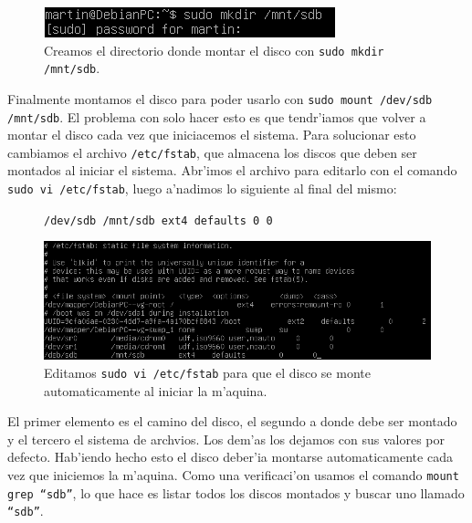 \documentclass[11pt]{article}
\newcommand{\codetext}[2]{\large\texttt{\textcolor{#1}{#2}}}
\begin{document}
		\begin{figure}[H]
    			\centering
    			\includegraphics[scale=0.75]{Images/rsync/rsync_disk_mount.PNG}
    			\caption{Creamos el directorio donde montar el disco con \texttt{sudo mkdir /mnt/sdb}.}
    			\label{fig:rsync_disk_mount}
		\end{figure}

		Finalmente montamos el disco para poder usarlo con \texttt{sudo mount /dev/sdb /mnt/sdb}. El problema con solo hacer esto es que tendr'iamos que volver a montar el disco cada vez que iniciacemos el sistema. Para solucionar esto cambiamos el archivo \texttt{/etc/fstab}, que almacena los discos que deben ser montados al iniciar el sistema. Abr'imos el archivo para editarlo con el comando \texttt{sudo vi /etc/fstab}, luego a'nadimos lo siguiente al final del mismo:

		\begin{figure}[H]
			\centering
			\begin{code-box}
				\codetext{dark-gray}{/dev/sdb /mnt/sdb ext4 defaults 0 0}
			\end{code-box}
		\end{figure}
		
		\begin{figure}[H]
    			\centering
    			\includegraphics[scale=0.65]{Images/rsync/rsync_disk_automount.PNG}
    			\caption{Editamos \texttt{sudo vi /etc/fstab} para que el disco se monte automaticamente al iniciar la m'aquina.}
    			\label{fig:rsync_disk_automount}
		\end{figure}

		El primer elemento es el camino del disco, el segundo a donde debe ser montado y el tercero el sistema de archvios. Los dem'as los dejamos con sus valores por defecto. Hab'iendo hecho esto el disco deber'ia montarse automaticamente cada vez que iniciemos la m'aquina. Como una verificaci'on usamos el comando \texttt{mount \textbar\/ grep ``sdb''}, lo que hace es listar todos los discos montados y buscar uno llamado \texttt{``sdb''}.
\end{document}
